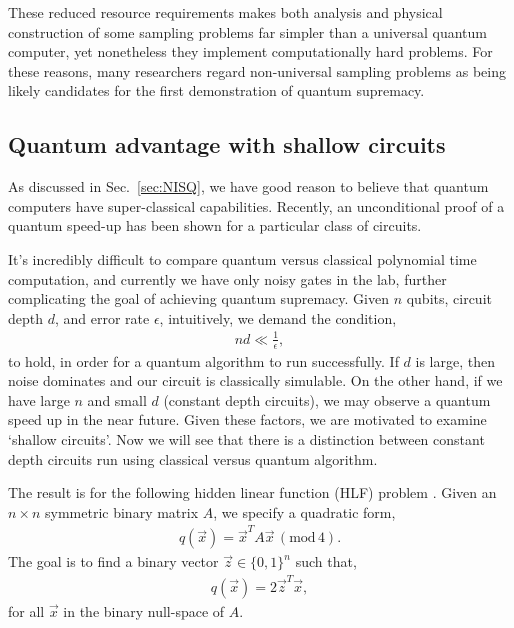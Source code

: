 These reduced resource requirements makes both analysis and physical construction of some sampling problems far simpler than a universal quantum computer, yet nonetheless they implement computationally hard problems. For these reasons, many researchers regard non-universal sampling problems as being likely candidates for the first demonstration of quantum supremacy.

%
%

\subsection{Quantum advantage with shallow circuits}\label{sec:shallow_circs}

As discussed in Sec.~\ref{sec:NISQ}, we have good reason to believe that quantum computers have super-classical capabilities. Recently, an unconditional proof of a quantum speed-up has been shown for a particular class of circuits.

It's incredibly difficult to compare quantum versus classical polynomial time computation, and currently we have only noisy gates in the lab, further complicating the goal of achieving quantum supremacy. Given $n$ qubits, circuit depth $d$, and error rate $\epsilon$, intuitively, we demand the condition,
\begin{align}
nd \ll \frac{1}{\epsilon},
\end{align}
to hold, in order for a quantum algorithm to run successfully. If $d$ is large, then noise dominates and our circuit is classically simulable. On the other hand, if we have large $n$ and small $d$ (constant depth circuits), we may observe a quantum speed up in the near future. Given these factors, we are motivated to examine `shallow circuits'. Now we will see that there is a distinction between constant depth circuits run using classical versus quantum algorithm.

The result is for the following hidden linear function (HLF) problem \cite{bib:bravyi2018quantum}. Given an \mbox{$n\times n$} symmetric binary matrix $A$, we specify a quadratic form,
\begin{align}
q(\vec x) = \vec x^T A \vec x \, (\mathrm{mod} \,4).
\end{align}
The goal is to find a binary vector $\vec z \in \{0,1\}^n$ such that,
\begin{align}
q(\vec x) = 2 \vec z^T \vec x,
\end{align}
for all $\vec x$ in the binary null-space of $A$.

